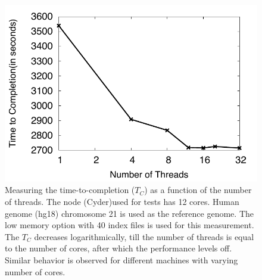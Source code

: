 \documentclass{cpeauth}
\begin{document}
%
%


 \begin{figure}
 \centering
\includegraphics[bb=0 0 340 300, scale=0.39]{figures/threadsvstime.pdf} 

\caption{\small Measuring the time-to-completion ($T_C$) as a function of the
  number of threads.  The node (Cyder)used for tests has 12 cores.  Human
  genome (hg18) chromosome 21 is used as the reference genome. The low
  memory option with 40 index files is used for this measurement. The
  $T_C$ decreases logarithmically, till the number of
  threads is equal to the number of cores, after which the performance
  levels off. Similar behavior is observed for different machines
  with varying number of cores.}
  \label{fig:threading-benchmark} 
 \end{figure}
\end{document}
